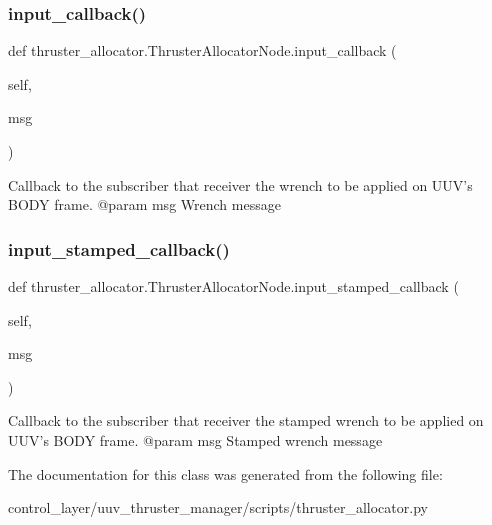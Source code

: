 \subsubsection{\texorpdfstring{input\+\_\+callback()}{input\_callback()}}
{\footnotesize\ttfamily def thruster\+\_\+allocator.\+Thruster\+Allocator\+Node.\+input\+\_\+callback (\begin{DoxyParamCaption}\item[{}]{self,  }\item[{}]{msg }\end{DoxyParamCaption})}

\begin{DoxyVerb}Callback to the subscriber that receiver the wrench to be applied on
UUV's BODY frame.
@param msg Wrench message
\end{DoxyVerb}
 \mbox{\label{classthruster__allocator_1_1ThrusterAllocatorNode_ad8da8c9132cddb33f020c62c86ccca3a}} 
\subsubsection{\texorpdfstring{input\+\_\+stamped\+\_\+callback()}{input\_stamped\_callback()}}
{\footnotesize\ttfamily def thruster\+\_\+allocator.\+Thruster\+Allocator\+Node.\+input\+\_\+stamped\+\_\+callback (\begin{DoxyParamCaption}\item[{}]{self,  }\item[{}]{msg }\end{DoxyParamCaption})}

\begin{DoxyVerb}Callback to the subscriber that receiver the stamped wrench to be
applied on UUV's BODY frame.
@param msg Stamped wrench message
\end{DoxyVerb}
 

The documentation for this class was generated from the following file\+:\begin{DoxyCompactItemize}
\item 
control\+\_\+layer/uuv\+\_\+thruster\+\_\+manager/scripts/thruster\+\_\+allocator.\+py\end{DoxyCompactItemize}
